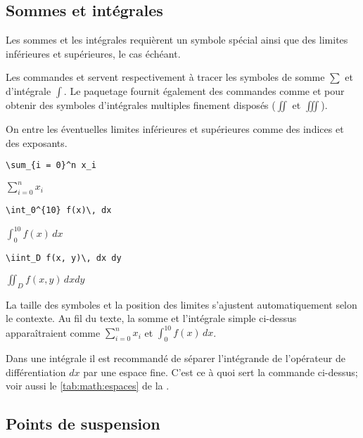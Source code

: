 \subsection{Sommes et intégrales}
\label{sec:math:bases:sommes-et-integrales}

Les sommes et les intégrales requièrent un symbole spécial ainsi que
des limites inférieures et supérieures, le cas échéant.

Les commandes \cmd{\sum} et \cmd{\int} servent respectivement à tracer
les symboles de somme $\sum$ et d'intégrale $\int$. Le paquetage
 fournit également des commandes comme \cmd{\iint} et
\cmd{\iiint} pour obtenir des symboles d'intégrales multiples finement
disposés ($\iint$ et $\iiint$).

On entre les éventuelles limites inférieures et supérieures comme des
indices et des exposants.
\begin{demo}
  \begin{texample}
\begin{lstlisting}
\sum_{i = 0}^n x_i
\end{lstlisting}
    \producing $\displaystyle \sum_{i = 0}^n x_i$
  \end{texample}

  \begin{texample}
\begin{lstlisting}
\int_0^{10} f(x)\, dx
\end{lstlisting}
    \producing $\displaystyle \int_0^{10} f(x)\, dx$
  \end{texample}

  \begin{texample}
\begin{lstlisting}
\iint_D f(x, y)\, dx dy
\end{lstlisting}
    \producing $\displaystyle \iint_D f(x, y)\, dx dy$
  \end{texample}
\end{demo}

La taille des symboles et la position des limites s'ajustent
automatiquement selon le contexte. Au fil du texte, la somme et
l'intégrale simple ci-dessus apparaîtraient comme $\sum_{i = 0}^n x_i$
et $\int_0^{10} f(x)\, dx$.

Dans une intégrale il est recommandé de séparer l'intégrande de
l'opérateur de différentiation $dx$ par une espace fine. C'est ce à
quoi sert la commande \cmd{\,} ci-dessus; voir aussi le
\autoref{tab:math:espaces} de la .

\subsection{Points de suspension}
\label{sec:math:bases:dots}

